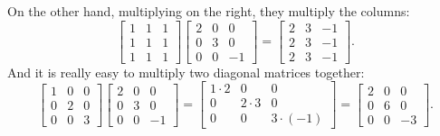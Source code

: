 \documentclass{ximera}
\begin{document}
On the other hand, multiplying on the right, they multiply the columns:
\begin{equation*}
    \begin{bmatrix}
        1 & 1 & 1 \\
        1 & 1 & 1 \\
        1 & 1 & 1 
    \end{bmatrix}
    \begin{bmatrix}
        2 & 0 & 0 \\
        0 & 3 & 0 \\
        0 & 0 & -1
    \end{bmatrix}
    =
    \begin{bmatrix}
        2 & 3 & -1 \\
        2 & 3 & -1 \\
        2 & 3 & -1 
    \end{bmatrix} .
\end{equation*}
And it is really easy to multiply two diagonal matrices together:
\begin{equation*}
    \begin{bmatrix}
        1 & 0 & 0 \\
        0 & 2 & 0 \\
        0 & 0 & 3 
    \end{bmatrix}
    \begin{bmatrix}
        2 & 0 & 0 \\
        0 & 3 & 0 \\
        0 & 0 & -1
    \end{bmatrix}
    =
    \begin{bmatrix}
        1 \cdot 2 & 0 & 0 \\
        0 & 2 \cdot 3 & 0 \\
        0 & 0 & 3 \cdot (-1) 
    \end{bmatrix}
    =
    \begin{bmatrix}
        2 & 0 & 0 \\
        0 & 6 & 0 \\
        0 & 0 & -3 
    \end{bmatrix} .
\end{equation*}
\end{document}
